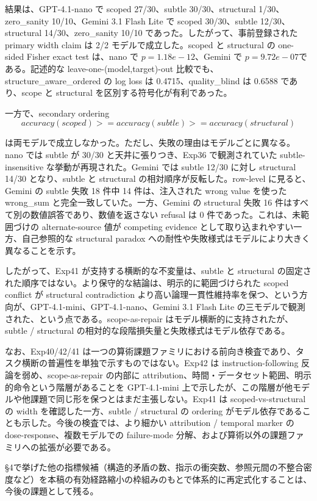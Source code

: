 \documentclass[12pt,a4paper]{article}
\begin{document}
結果は、GPT-4.1-nano で scoped 27/30、subtle 30/30、structural 1/30、zero\_sanity 10/10、Gemini 3.1 Flash Lite で scoped 30/30、subtle 12/30、structural 14/30、zero\_sanity 10/10 であった。したがって、事前登録された primary width claim は 2/2 モデルで成立した。scoped と structural の one-sided Fisher exact test は、nano で \(p = 1.18e-12\)、Gemini で \(p = 9.72e-07\)である。記述的な leave-one-(model,target)-out 比較でも、structure\_aware\_ordered の log loss は 0.4715、quality\_blind は 0.6588 であり、scope と structural を区別する符号化が有利であった。

一方で、secondary ordering \[
accuracy(scoped) >= accuracy(subtle) >= accuracy(structural)
\]

は両モデルで成立しなかった。ただし、失敗の理由はモデルごとに異なる。nano では subtle が 30/30 と天井に張りつき、Exp36 で観測されていた subtle-insensitive な挙動が再現された。Gemini では subtle 12/30 に対し structural 14/30 となり、subtle と structural の相対順序が反転した。row-level に見ると、Gemini の subtle 失敗 18 件中 14 件は、注入された wrong value を使った wrong\_sum と完全一致していた。一方、Gemini の structural 失敗 16 件はすべて別の数値誤答であり、数値を返さない refusal は 0 件であった。これは、未範囲づけの alternate-source 値が competing evidence として取り込まれやすい一方、自己参照的な structural paradox への耐性や失敗様式はモデルにより大きく異なることを示す。

したがって、Exp41 が支持する横断的な不変量は、subtle と structural の固定された順序ではない。より保守的な結論は、明示的に範囲づけられた scoped conflict が structural contradiction より高い論理一貫性維持率を保つ、という方向が、GPT-4.1-mini、GPT-4.1-nano、Gemini 3.1 Flash Lite の三モデルで観測された、という点である。scope-as-repair はモデル横断的に支持されたが、subtle / structural の相対的な段階損失量と失敗様式はモデル依存である。

なお、Exp40/42/41 は一つの算術課題ファミリにおける前向き検査であり、タスク横断の普遍性を単独で示すものではない。Exp42 は instruction-following 反論を弱め、scope-as-repair の内部に attribution、時間・データセット範囲、明示的命令という階層があることを GPT-4.1-mini 上で示したが、この階層が他モデルや他課題で同じ形を保つとはまだ主張しない。Exp41 は scoped-vs-structural の width を確認した一方、subtle / structural の ordering がモデル依存であることも示した。今後の検査では、より細かい attribution / temporal marker の dose-response、複数モデルでの failure-mode 分解、および算術以外の課題ファミリへの拡張が必要である。

§4で挙げた他の指標候補（構造的矛盾の数、指示の衝突数、参照元間の不整合密度など）を本稿の有効経路縮小の枠組みのもとで体系的に再定式化することは、今後の課題として残る。
\end{document}
